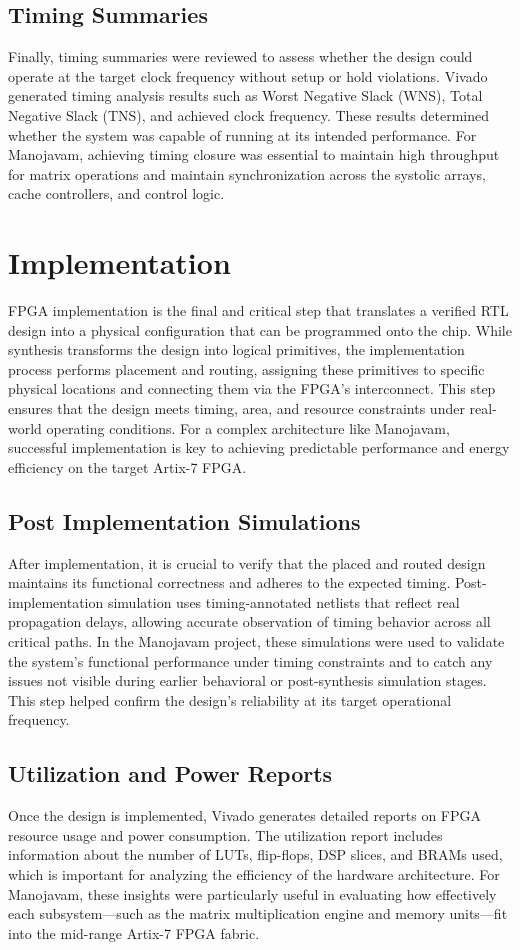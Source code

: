 \subsection{Timing Summaries}
Finally, timing summaries were reviewed to assess whether the design could operate at the target clock frequency without setup or hold violations. Vivado generated timing analysis results such as Worst Negative Slack (WNS), Total Negative Slack (TNS), and achieved clock frequency. These results determined whether the system was capable of running at its intended performance. For Manojavam, achieving timing closure was essential to maintain high throughput for matrix operations and maintain synchronization across the systolic arrays, cache controllers, and control logic.

\section{Implementation}
FPGA implementation is the final and critical step that translates a verified RTL design into a physical configuration that can be programmed onto the chip. While synthesis transforms the design into logical primitives, the implementation process performs placement and routing, assigning these primitives to specific physical locations and connecting them via the FPGA’s interconnect. This step ensures that the design meets timing, area, and resource constraints under real-world operating conditions. For a complex architecture like Manojavam, successful implementation is key to achieving predictable performance and energy efficiency on the target Artix-7 FPGA.

\subsection{Post Implementation Simulations}
After implementation, it is crucial to verify that the placed and routed design maintains its functional correctness and adheres to the expected timing. Post-implementation simulation uses timing-annotated netlists that reflect real propagation delays, allowing accurate observation of timing behavior across all critical paths. In the Manojavam project, these simulations were used to validate the system’s functional performance under timing constraints and to catch any issues not visible during earlier behavioral or post-synthesis simulation stages. This step helped confirm the design’s reliability at its target operational frequency.

\subsection{Utilization and Power Reports}
Once the design is implemented, Vivado generates detailed reports on FPGA resource usage and power consumption. The utilization report includes information about the number of LUTs, flip-flops, DSP slices, and BRAMs used, which is important for analyzing the efficiency of the hardware architecture. For Manojavam, these insights were particularly useful in evaluating how effectively each subsystem—such as the matrix multiplication engine and memory units—fit into the mid-range Artix-7 FPGA fabric.

